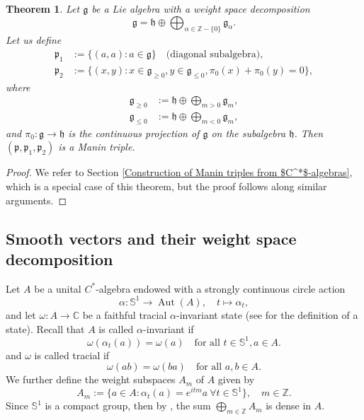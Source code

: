 \documentclass[11pt,reqno]{amsart}
\newtheorem{theorem}{Theorem}[section]
\theoremstyle{definition}
\numberwithin{equation}{section}
\begin{document}
\begin{theorem}\label{Weight space decomposition-manin}
Let $\mathfrak{g}$ be a Lie algebra with a weight space decomposition
\[
\mathfrak{g} = \mathfrak{h} \oplus \bigoplus_{\alpha \in \mathbb{Z} - \{0\}} \mathfrak{g}_{\alpha}.
\]
Let us define
\begin{align*}
\mathfrak{p}_1 &:= \{(a, a) : a \in \mathfrak{g}\} \quad \text{(diagonal subalgebra)}, \\
\mathfrak{p}_2 &:= \{(x, y) : x \in \mathfrak{g}_{\ge 0}, y \in \mathfrak{g}_{\le 0}, \pi_0(x) + \pi_0(y) = 0\},
\end{align*}
where
\begin{align*}
\mathfrak{g}_{\ge 0} &:= \mathfrak{h} \oplus \bigoplus_{m > 0} \mathfrak{g}_m, \\
\mathfrak{g}_{\le 0} &:= \mathfrak{h} \oplus \bigoplus_{m < 0} \mathfrak{g}_m,
\end{align*}
and $\pi_0: \mathfrak{g} \rightarrow \mathfrak{h}$ is the continuous projection of $\mathfrak{g}$ on the subalgebra $\mathfrak{h}$. Then $(\mathfrak{p}, \mathfrak{p}_1, \mathfrak{p}_2)$ is a Manin triple.
\end{theorem}

\begin{proof}
We refer to Section \ref{Construction of Manin triples from $C^*$-algebras}, which is a special case of this theorem, but the proof follows along similar arguments.
\end{proof}

\subsection{Smooth vectors and their weight space decomposition}
Let $A$ be a unital $C^*$-algebra endowed with a strongly continuous circle action \[\alpha : \mathbb{S}^1 \rightarrow \operatorname{Aut}(A),  \quad t \mapsto \alpha_t,\] and let $\omega : A \rightarrow \mathbb{C}$ be a faithful tracial $\alpha$-invariant state  (see \cite[Section 2.3]{4} for the definition of a state). Recall that $A$  is called  $\alpha$-invariant if \[
\omega(\alpha_t(a)) = \omega(a) \quad \text{for all } t \in \mathbb{S}^1, a \in A.
\] 
and $\omega$ is called tracial if
\[
\omega(ab) = \omega(ba)  \quad \text{for all } a,b\in A.
\]
We further define the weight subspaces $A_m$ of $A$ given by
\[
A_m := \{a \in A : \alpha_t(a) = e^{itm}a \ \forall t \in \mathbb{S}^1\}, \quad m \in \mathbb{Z}.
\]
Since $\mathbb{S}^1$ is a compact group, then by \cite{18}, the sum
$
\bigoplus_{m \in \mathbb{Z}} A_m$ is dense in $A$.
\end{document}
